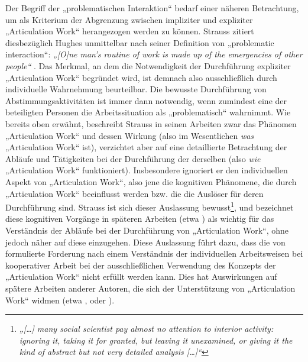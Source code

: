 Der Begriff der „problematischen Interaktion“ bedarf einer näheren Betrachtung, um als Kriterium der Abgrenzung zwischen impliziter und expliziter „Articulation Work“ herangezogen werden zu können. Strauss zitiert diesbezüglich Hughes unmittelbar nach seiner Definition von „problematic interaction“: \emph{„[O]ne man's routine of work is made up of the emergencies of other people“} \citep[][zitiert nach \citep{Strauss93}]{Hughes71}. Das Merkmal, an dem die Notwendigkeit der Durchführung expliziter „Articulation Work“ begründet wird, ist demnach also ausschließlich durch individuelle Wahrnehmung beurteilbar. Die bewusste Durchführung von Abstimmungsaktivitäten ist immer dann notwendig, wenn zumindest eine der beteiligten Personen die Arbeitssituation als „problematisch“ wahrnimmt. Wie bereits oben erwähnt, beschreibt Strauss in seinen Arbeiten zwar das Phänomen „Articulation Work“ und dessen Wirkung (also im Wesentlichen \emph{was} „Articulation Work“ ist), verzichtet aber auf eine detaillierte Betrachtung der Abläufe und Tätigkeiten bei der Durchführung der derselben (also \emph{wie} „Articulation Work“ funktioniert). Insbesondere ignoriert er den individuellen Aspekt von „Articulation Work“, also jene die kognitiven Phänomene, die durch „Articulation Work“ beeinflusst werden bzw. die die Auslöser für deren Durchführung sind. Strauss ist sich dieser Auslassung bewusst\footnote{\emph{„[\ldots] many social scientist pay almost no attention to interior activity: ignoring it, taking it for granted, but leaving it unexamined, or giving it the kind of abstract but not very detailed analysis [\ldots]“}\citep[][S. 131]{Strauss93}}, und bezeichnet diese kognitiven Vorgänge in späteren Arbeiten (etwa \citep{Strauss93})  als wichtig für das Verständnis der Abläufe bei der Durchführung von „Articulation Work“, ohne jedoch näher auf diese einzugehen. Diese Auslassung führt dazu, dass die von \citet{Grudin88} formulierte Forderung nach einem Verständnis der individuellen Arbeitsweisen bei kooperativer Arbeit bei der ausschließlichen Verwendung des Konzepts der „Articulation Work“ nicht erfüllt werden kann. Dies hat Auswirkungen auf spätere Arbeiten anderer Autoren, die sich der Unterstützung von „Articulation Work“ widmen (etwa \citet{Schmidt92}, \citet{Simone99} oder \citet{Baker07}).

